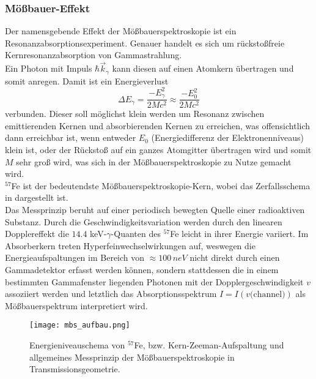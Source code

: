 \documentclass[german,  %
parskip=full,  %
headsepline]{scrartcl}
\newcommand{\bcref}[1]{\namecref{#1} \textcolor{blue}{\labelcref{#1}}}
\begin{document}
\subsubsection{Mößbauer-Effekt}
Der namensgebende Effekt der Mößbauerspektroskopie ist ein Resonanzabsorptionsexperiment. Genauer handelt es sich um rückstoßfreie Kernresonanzabsorption von Gammastrahlung.\\
Ein Photon mit Impuls $\hbar \Vec{k}_{\gamma}$ kann diesen auf einen Atomkern übertragen und somit anregen. Damit ist ein Energieverlust 
\begin{equation}
    \Delta E_{\gamma} = \frac{-E_{\gamma}^2}{2Mc^2} \approx \frac{-E_{0}^2}{2Mc^2} 
\end{equation}
verbunden. Dieser soll möglichst klein werden um Resonanz zwischen emittierenden Kernen und absorbierenden Kernen zu erreichen, was offensichtlich dann erreichbar ist, wenn entweder $E_0$ (Energiedifferenz der Elektronenniveaus) klein ist, oder der Rückstoß auf ein ganzes Atomgitter übertragen wird und somit $M$ sehr groß wird, was sich in der Mößbauerspektroskopie zu Nutze gemacht wird.\\
$^{57}$Fe ist der bedeutendste Mößbauerspektroskopie-Kern, wobei das Zerfallsschema in \bcref{fig:aufbau} dargestellt ist.\\
Das Messprinzip beruht auf einer periodisch bewegten Quelle einer radioaktiven Substanz. Durch die Geschwindigkeitsvariation werden durch den linearen Dopplereffekt die $14.4$ keV-$\gamma$-Quanten des $^{57}$Fe leicht in ihrer Energie variiert. Im Absorberkern treten Hyperfeinwechselwirkungen auf, weswegen die Energieaufspaltungen im Bereich von $\approx 100\, \si{neV}$ nicht direkt durch einen Gammadetektor erfasst werden können, sondern stattdessen die in einem bestimmten Gammafenster liegenden Photonen mit der Dopplergeschwindigkeit $v$ assoziiert werden und letztlich das Absorptionsspektrum $I = I(v\text{(channel)})$ als Mößbauerspektrum interpretiert wird.

\begin{figure}[h!]
    \centering
    \texttt{[image: mbs\_aufbau.png]}
    \caption{Energieniveauschema von $^{57}$Fe, bzw. Kern-Zeeman-Aufspaltung und allgemeines Messprinzip der Mößbauerspektroskopie in Transmissionsgeometrie.}
    \label{fig:aufbau}
\end{figure}
\end{document}

